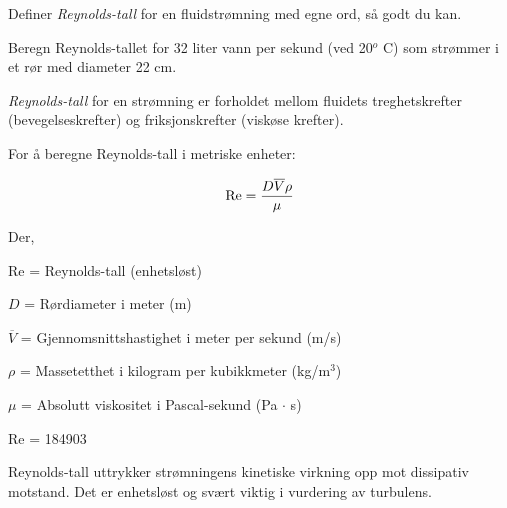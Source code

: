 
Definer {\it Reynolds-tall} for en fluidstrømning med egne ord, så godt du kan.

\vskip 10pt

Beregn Reynolds-tallet for 32 liter vann per sekund (ved 20$^{o}$ C) som strømmer i et rør med diameter 22 cm.







{\it Reynolds-tall} for en strømning er forholdet mellom fluidets treghetskrefter (bevegelseskrefter) og friksjonskrefter (viskøse krefter).

\vskip 30pt

For å beregne Reynolds-tall i metriske enheter:

$$\hbox{Re} = {{D \overline{V} \rho} \over \mu}$$

\noindent
Der,

Re = Reynolds-tall (enhetsløst)

$D$ = Rørdiameter i meter (m)

$\overline{V}$ = Gjennomsnittshastighet i meter per sekund (m/s)

$\rho$ = Massetetthet i kilogram per kubikkmeter (kg/m$^{3}$)

$\mu$ = Absolutt viskositet i Pascal-sekund (Pa $\cdot$ s)

\vskip 60pt \goodbreak

Re = 184903







Reynolds-tall uttrykker strømningens kinetiske virkning opp mot dissipativ motstand. Det er enhetsløst og svært viktig i vurdering av turbulens.


